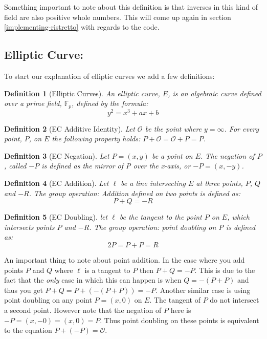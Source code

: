 \documentclass{article}
\newtheorem{definition}{Definition}[section]
\renewcommand{\O}{\mathcal{O}}
\newcommand{\F}{\mathbb{F}}
\begin{document}
Something important to note about this definition is that inverses in
this kind of field are also positive whole numbers. This will come up
again in section \ref{implementing-ristretto} with regards to the code.

\subsection{Elliptic Curve:}\label{elliptic-curves}

To start our explanation of elliptic curves we add a few definitions:

\begin{definition}[Elliptic Curves]
	An elliptic curve, $E$, is an algebraic curve defined over a prime field, $\F_p$, defined by the formula:
	$$y^2 = x^3 + ax + b$$
\end{definition}

\begin{definition}[EC Additive Identity]
	Let $\O$ be the point where $y = \infty$. For every point, $P$,
	on $E$ the following property holds:
	$P + \O = \O + P = P$.
\end{definition}

\begin{definition}[EC Negation]
	Let $P = (x,y)$ be a point on $E$. The negation of $P$, called $-P$
	is defined as the mirror of P over the x-axis, or $-P = (x,-y)$.
\end{definition}

\begin{definition}[EC Addition]
	Let $\ell$ be a line intersecting $E$ at three points, $P$, $Q$ and
	$-R$. The group operation: Addition defined on two points is defined
	as:
	$$P + Q = {-R}$$
\end{definition}

\begin{definition}[EC Doubling]
	let $\ell$ be the tangent to the point $P$ on $E$, which intersects
	points $P$ and $-R$. The group operation: point doubling on P is
	defined as:
	$$2P = P + P = R$$
\end{definition}

An important thing to note about point addition. In the case where
you add points $P$ and $Q$ where $\ell$ is a tangent to $P$ then $P +
Q = -P$. This is due to the fact that the \textit{only} case in which
this can happen is when $Q = -(P + P)$ and thus you get $P + Q = P +
(-(P + P)) = -P$. Another similar case is using point doubling on any
point $P = (x,0)$ on $E$. The tangent of $P$ do not intersect
a second point. However note that the negation of $P$ here is $-P =
(x,-0) = (x,0) = P$. Thus point doubling on these points is equivalent
to the equation $P + (-P) = \O$.
\end{document}
